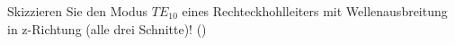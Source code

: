 \begin{question}[section=,name={},difficulty=,quantity=,type=thr,tags={20151210}]
	Skizzieren Sie den Modus $TE_{10}$ eines Rechteckhohlleiters mit Wellenausbreitung in z-Richtung (alle drei Schnitte)! ()
	
	
\end{question}
\begin{solution}
	
\end{solution}